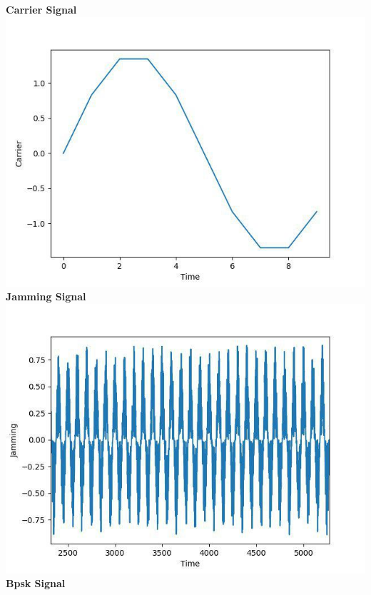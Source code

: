 \documentclass[a4paper,10pt]{article}
\begin{document}
\begin{center}
\vspace*{1cm}
\large{\textbf{Carrier Signal}}\\
\includegraphics[width=15cm, height=10cm]{fig2}\\
\newpage
\vspace*{1cm}
\large{\textbf{Jamming Signal}}\\
\includegraphics[width=15cm, height=10cm]{fig3}\\
\vspace*{1cm}
\large{\textbf{Bpsk Signal}}\\

\end{center}
\end{document}
